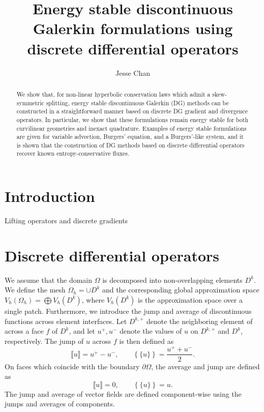 \documentclass[preprint,10pt]{article}
\date{}
\author{Jesse Chan}
\title{Energy stable discontinuous Galerkin formulations using discrete differential operators}
\theoremstyle{definition}
\theoremstyle{lemma}
\newcommand{\LRp}[1]{\left( #1 \right)}
\newcommand{\LRc}[1]{\left\{ #1 \right\}}
\newcommand{\jump}[1] {\ensuremath{\llbracket#1\rrbracket}}
\newcommand{\avg}[1] {\ensuremath{\LRc{\!\{#1\}\!}}}
\begin{document}
\maketitle

\begin{abstract}
We show that, for non-linear hyperbolic conservation laws which admit a skew-symmetric splitting, energy stable discontinuous Galerkin (DG) methods can be constructed in a straightforward manner based on discrete DG gradient and divergence operators.  In particular, we show that these formulations remain energy stable for both curvilinear geometries and inexact quadrature.  Examples of energy stable formulations are given for variable advection, Burgers' equation, and a Burgers'-like system, and it is shown that the construction of DG methods based on discrete differential operators recover known entropy-conservative fluxes.  
\end{abstract}

\section{Introduction}

\cite{feng2016discontinuous}

Lifting operators  and discrete gradients \cite{bassi1997high, di2011mathematical}

\section{Discrete differential operators}

We assume that the domain $\Omega$ is decomposed into non-overlapping elements $D^k$.  We define the mesh $\Omega_h = \cup D^k$ and the corresponding global approximation space $V_h(\Omega_h) = \bigoplus V_h\LRp{D^k}$, where $V_h\LRp{D^k}$ is the approximation space over a single patch.  Furthermore, we introduce the jump and average of discontinuous functions across element interfaces.  Let $D^{k,+}$ denote the neighboring element of across a face $f$ of $D^k$, and let $u^+,u^-$ denote the values of $u$ on $D^{k,+}$ and $D^k$, respectively.  The jump of $u$ across $f$ is then defined as
\[
\jump{u} = u^+ - u^-, \qquad \avg{u} = \frac{u^+ + u^-}{2}.
\]
On faces which coincide with the boundary $\partial \Omega$, the average and jump are defined as
\[
\jump{u} = 0, \qquad \avg{u} = u.
\]
The jump and average of vector fields are defined component-wise using the jumps and averages of components.  
\end{document}
